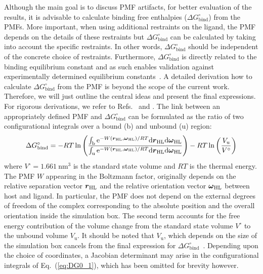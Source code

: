 \documentclass[9pt,lessons]{livecoms}
\begin{document}
Although the main goal is to discuss PMF artifacts, for better evaluation of the results, it is advisable to calculate binding free enthalpies ($\Delta G^\circ_\mathrm{bind}$) from the PMFs.
More important, when using additional restraints on the ligand, the PMF depends on the details of these restraints but $\Delta G^\circ_\mathrm{bind}$ can be calculated by taking into account the specific restraints.
In other words, $\Delta G^\circ_\mathrm{bind}$ should be independent of the concrete choice of restraints. 
Furthermore, $\Delta G^\circ_\mathrm{bind}$ is directly related to the binding equilibrium constant and as such enables validation against experimentally determined equilibrium constants~\cite{markthaler2017molecular}.
%
A detailed derivation how to calculate $\Delta G^\circ_\mathrm{bind}$ from the PMF is beyond the scope of the current work.
Therefore, we will just outline the central ideas and present the final expressions. 
For rigorous derivations, we refer to Refs.~ and .
The link between an appropriately defined PMF and $\Delta G^\circ_\mathrm{bind}$ can be formulated as the ratio of two configurational integrals over a bound (b) and unbound (u) region: 
\begin{equation}
	\Delta G^\circ_\mathrm{bind} =  
	 -RT \ln\left(
	\frac{\int_\mathrm{b}{\mathrm{e}^{- W(\text{\boldmath $r$}_\mathrm{HL},\text{\boldmath$\omega$}_\mathrm{HL})/RT} \mathrm{d}\text{\boldmath $r$}_\mathrm{HL} \mathrm{d}\text{\boldmath$\omega$}_\mathrm{HL}}}
	{\int_\mathrm{u}{\mathrm{e}^{- W(\text{\boldmath $r$}_\mathrm{HL},\text{\boldmath$\omega$}_\mathrm{HL})/RT} \mathrm{d}\text{\boldmath $r$}_\mathrm{HL} \mathrm{d}\text{\boldmath$\omega$}_\mathrm{HL}}}
	\right) -RT \ln\left(\frac{V_\mathrm{u}}{V^\circ}\right)
	\label{eq:DG0_1}
\end{equation}
where $V^\circ = 1.661~\mathrm{nm}^3$ is the standard state volume and $R T$ is the thermal energy.
The PMF $W$ appearing in the Boltzmann factor, originally depends on the relative separation vector $\text{\boldmath $r$}_\mathrm{HL}$ and the relative orientation vector $\text{\boldmath$\omega$}_\mathrm{HL}$ 
between host and ligand. In particular, the PMF does not depend on the external degrees of freedom of the complex corresponding to the absolute position and the overall orientation inside the simulation box.
The second term  accounts for the free energy contribution of the volume change from the standard state volume $V^\circ$ to the unbound volume $V_\mathrm{u}$. 
It should be noted that $V_\mathrm{u}$, which depends on the size of the simulation box cancels from the final expression for $\Delta G^\circ_\mathrm{bind}$~\cite{general2010note}.
Depending upon the choice of coordinates, a Jacobian determinant may arise in the configurational integrals of Eq.~(\ref{eq:DG0_1}), which has been omitted for brevity however.
\end{document}
